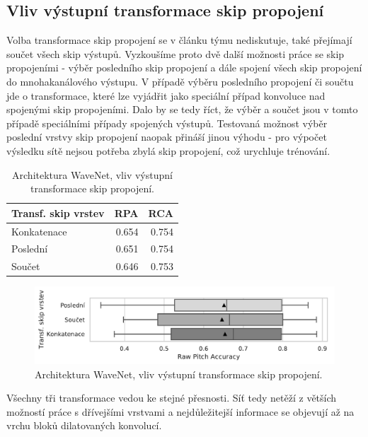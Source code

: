\subsection{Vliv výstupní transformace skip propojení}

Volba transformace skip propojení se v článku týmu \cite{Oord2016} nediskutuje, \cite{Martak2018} také přejímají součet všech skip výstupů. Vyzkoušíme proto dvě další možnosti práce se skip propojeními - výběr posledního skip propojení a dále spojení všech skip propojení do mnohakanálového výstupu. V případě výběru posledního propojení či součtu jde o transformace, které lze vyjádřit jako speciální případ konvoluce nad spojenými skip propojeními. Dalo by se tedy říct, že výběr a součet jsou v tomto případě speciálními případy spojených výstupů. Testovaná možnost výběr poslední vrstvy skip propojení naopak přináší jinou výhodu - pro výpočet výsledku sítě nejsou potřeba zbylá skip propojení, což urychluje trénování.

\begin{table}[h!]
\centering
    \begin{tabular}{lrr}
    \toprule
    Transf. skip vrstev &   RPA &   RCA \\
    \midrule
            Konkatenace & 0.654 & 0.754 \\
            Poslední & 0.651 & 0.754 \\
                Součet & 0.646 & 0.753 \\
    \bottomrule
    \end{tabular}

\caption{Architektura WaveNet, vliv výstupní transformace skip propojení.}\label{tab:wavenet_skip_reduction}
\end{table}

\begin{figure}[h]\centering
    \includegraphics[scale=0.6  ]{../img/figures/wavenet_skip_reduction_grey}
\caption{Architektura WaveNet, vliv výstupní transformace skip propojení.}\label{obr:wavenet_skip_reduction}
\end{figure}

Všechny tři transformace vedou ke stejné přesnosti. Síť tedy netěží z větších možností práce s dřívejšími vrstvami a nejdůležitejší informace se objevují až na vrchu bloků dilatovaných konvolucí.

